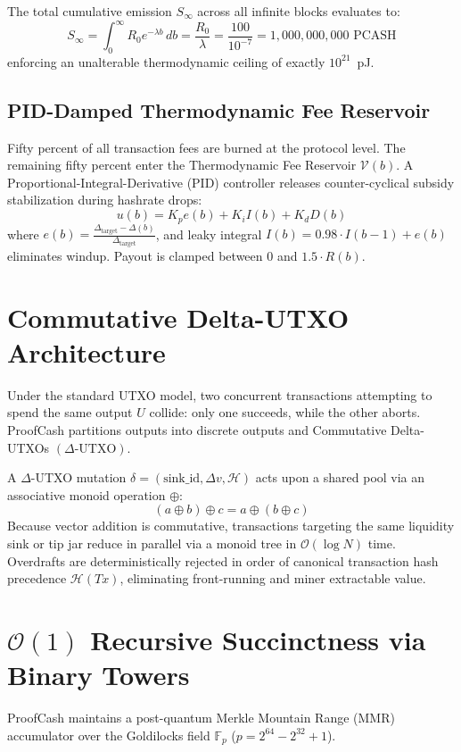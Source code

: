 \documentclass[10pt,conference,letterpaper]{IEEEtran}
\begin{document}
The total cumulative emission $S_{\infty}$ across all infinite blocks evaluates to:
\begin{equation}
S_{\infty} = \int_{0}^{\infty} R_0 e^{-\lambda b} \, db = \frac{R_0}{\lambda} = \frac{100}{10^{-7}} = 1{,}000{,}000{,}000 \text{ PCASH}
\end{equation}
enforcing an unalterable thermodynamic ceiling of exactly $10^{21}$~pJ.

\subsection{PID-Damped Thermodynamic Fee Reservoir}
Fifty percent of all transaction fees are burned at the protocol level. The remaining fifty percent enter the Thermodynamic Fee Reservoir $\mathcal{V}(b)$. A Proportional-Integral-Derivative (PID) controller releases counter-cyclical subsidy stabilization during hashrate drops:
\begin{equation}
u(b) = K_p e(b) + K_i I(b) + K_d D(b)
\end{equation}
where $e(b) = \frac{\Delta_{\text{target}} - \Delta(b)}{\Delta_{\text{target}}}$, and leaky integral $I(b) = 0.98 \cdot I(b-1) + e(b)$ eliminates windup. Payout is clamped between $0$ and $1.5 \cdot R(b)$.

\section{Commutative Delta-UTXO Architecture}
Under the standard UTXO model, two concurrent transactions attempting to spend the same output $U$ collide: only one succeeds, while the other aborts. ProofCash partitions outputs into discrete outputs and Commutative Delta-UTXOs $(\Delta \text{-UTXO})$.

A $\Delta$-UTXO mutation $\delta = (\text{sink\_id}, \Delta v, \mathcal{H})$ acts upon a shared pool via an associative monoid operation $\oplus$:
\begin{equation}
(a \oplus b) \oplus c = a \oplus (b \oplus c)
\end{equation}
Because vector addition is commutative, transactions targeting the same liquidity sink or tip jar reduce in parallel via a monoid tree in $\mathcal{O}(\log N)$ time. Overdrafts are deterministically rejected in order of canonical transaction hash precedence $\mathcal{H}(Tx)$, eliminating front-running and miner extractable value.

\section{$\mathcal{O}(1)$ Recursive Succinctness via Binary Towers}
ProofCash maintains a post-quantum Merkle Mountain Range (MMR) accumulator over the Goldilocks field $\mathbb{F}_p$ ($p = 2^{64} - 2^{32} + 1$). 
\end{document}
